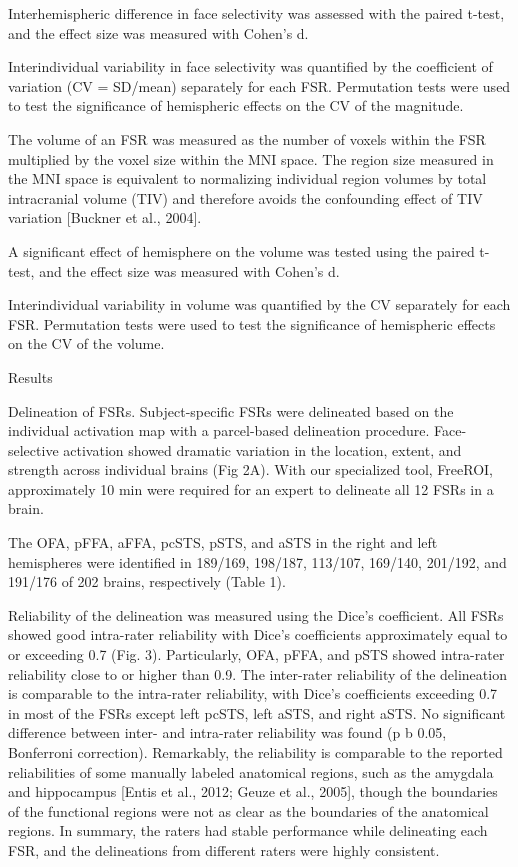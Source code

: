 %
Interhemispheric difference in face selectivity was assessed with the paired
t-test, and the effect size was measured with Cohen's d.

%
Interindividual variability in face selectivity was quantified by the
coefficient of variation (CV = SD/mean) separately for each FSR.
%
Permutation tests were used to test the significance of hemispheric effects on
the CV of the magnitude.

%
The volume of an FSR was measured as the number of voxels within the FSR
multiplied by the voxel size within the MNI space.
%
The region size measured in the MNI space is equivalent to normalizing
individual region volumes by total intracranial volume (TIV) and therefore
avoids the confounding effect of TIV variation [Buckner et al., 2004].

%
A significant effect of hemisphere on the volume was tested using the paired
t-test, and the effect size was measured with Cohen's d.

%
Interindividual variability in volume was quantified by the CV separately for
each FSR.
%
Permutation tests were used to test the significance of hemispheric effects on
the CV of the volume.

Results

Delineation of FSRs.
%
Subject-specific FSRs were delineated based on the individual activation map
with a parcel-based delineation procedure.
%
Face-selective activation showed dramatic variation in the location, extent, and
strength across individual brains (Fig 2A).
%
With our specialized tool, FreeROI, approximately 10 min were required for an
expert to delineate all 12 FSRs in a brain.

%
The OFA, pFFA, aFFA, pcSTS, pSTS, and aSTS in the right and left hemispheres
were identified in 189/169, 198/187, 113/107, 169/140, 201/192, and 191/176 of
202 brains, respectively (Table 1).


Reliability of the delineation was measured using the Dice's coefficient.
%
All FSRs showed good intra-rater reliability with Dice's coefficients
approximately equal to or exceeding 0.7 (Fig. 3).
%
Particularly, OFA, pFFA, and pSTS showed intra-rater reliability close to or
higher than 0.9.
%
The inter-rater reliability of the delineation is comparable to the intra-rater
reliability, with Dice's coefficients exceeding 0.7 in most of the FSRs except
left pcSTS, left aSTS, and right aSTS.
%
No significant difference between inter- and intra-rater reliability was found
(p b 0.05, Bonferroni correction).
%
Remarkably, the reliability is comparable to the reported reliabilities of some
manually labeled anatomical regions, such as the amygdala and hippocampus [Entis
et al., 2012; Geuze et al., 2005], though the boundaries of the functional
regions were not as clear as the boundaries of the anatomical regions.
%
In summary, the raters had stable performance while delineating each FSR, and
the delineations from different raters were highly consistent.

